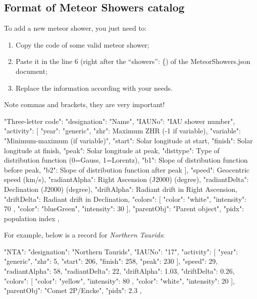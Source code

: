 \subsection{Format of Meteor Showers catalog}
\label{sec:plugins:MeteorShowers:format}

To add a new meteor shower, you just need to:
\begin{enumerate}
\item Copy the code of some valid meteor shower;
\item Paste it in the line 6 (right after the ``showers'': \{) of the MeteorShowers.json document;
\item Replace the information according with your needs.
\end{enumerate}
Note commas and brackets, they are very important!

\begin{configfile}[\footnotesize]
"Three-letter code":
    {
        "designation": "Name",
        "IAUNo": "IAU shower number",
        "activity":
        [
        {
            "year": "generic",
            "zhr": Maximum ZHR (-1 if variable),
            "variable": "Minimum-maximum (if variable)",
            "start": Solar longitude at start,
            "finish": Solar longitude at finish,
            "peak": Solar longitude at peak,
            "disttype": Type of distribution function
                        (0=Gauss, 1=Lorentz),
            "b1": Slope of distribution function
                  before peak,
            "b2": Slope of distribution function
                  after peak
        }
        ],
        "speed": Geocentric speed (km/s),
        "radiantAlpha": Right Ascension (J2000) (degree),
        "radiantDelta": Declination (J2000) (degree),
        "driftAlpha": Radiant drift in Right Ascension,
        "driftDelta": Radiant drift in Declination,
        "colors":
        [
        {
            "color": "white",
            "intensity": 70
        },
        {
            "color": "blueGreen",
            "intensity": 30
        }
        ],
        "parentObj": "Parent object",
        "pidx": population index
    },
\end{configfile}

For example, below is a record for \textit{Northern Taurids}:

\begin{configfile}[\footnotesize]
"NTA":
    {
        "designation": "Northern Taurids",
        "IAUNo": "17",
        "activity":
        [
        {
            "year": "generic",
            "zhr": 5,
            "start": 206,
            "finish": 258,
            "peak": 230
        }
        ],
        "speed": 29,
        "radiantAlpha": 58,
        "radiantDelta": 22,
        "driftAlpha": 1.03,
        "driftDelta": 0.26,
        "colors":
        [
        {
            "color": "yellow",
            "intensity": 80
        },
        {
            "color": "white",
            "intensity": 20
        }
        ],
        "parentObj": "Comet 2P/Encke",
        "pidx": 2.3
    },
\end{configfile}

